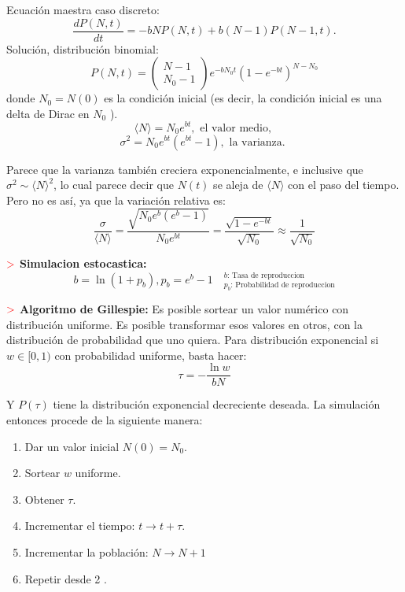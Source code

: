 \documentclass[%
 reprint,
 amsmath,amssymb,
 aps,
]{revtex4-1}
\newcommand{\propiedad}{\textcolor{red}{\mathbf{>}}}
\begin{document}
Ecuación maestra caso discreto:
$$
  \frac{d P(N, t)}{d t}=-b N P(N, t)+b(N-1) P(N-1, t) .
$$
Solución, distribución binomial: 
$$
P(N, t)=\left(\begin{array}{c}
N-1 \\
N_{0}-1
\end{array}\right) e^{-b N_{0} t}\left(1-e^{-b t}\right)^{N-N_{0}}
$$
donde $N_{0}=N(0)$ es la condición inicial (es decir, la condición inicial es una delta de Dirac en $N_{0}$ ).
$$
\langle N\rangle=N_{0} e^{b t}, \text { el valor medio, }
$$
$$
\sigma^{2}=N_{0} e^{b t}\left(e^{b t}-1\right), \text { la varianza. }
$$

Parece que la varianza también creciera exponencialmente, e inclusive que $\sigma^{2} \sim\langle N\rangle^{2}$, lo cual parece decir que $N(t)$ se aleja de $\langle N\rangle$ con el paso del tiempo. Pero no es así, ya que la variación relativa es:
$$
\frac{\sigma}{\langle N\rangle}=\frac{\sqrt{N_{0} e^{b}\left(e^{b}-1\right)}}{N_{0} e^{b t}}=\frac{\sqrt{1-e^{- b{t} }}}{\sqrt{N_{0}}} \approx \frac{1}{\sqrt{N_{0}}}
$$

$\propiedad$ \textbf{Simulacion estocastica:}
$$
  b=\ln \left(1+p_{b}\right), p_{b}=e^{b}-1 \quad
  ^{b \text{: Tasa de reproduccion}}
  _{p_b \text{: Probabilidad de reproduccion}}
$$


$\propiedad$ \textbf{Algoritmo de Gillespie:}
Es posible sortear un valor numérico con distribución uniforme. Es posible transformar esos valores en otros, con la distribución de probabilidad que uno quiera. Para distribución exponencial si $w \in[0,1)$ con probabilidad uniforme, basta hacer:
$$
\tau=-\frac{\ln w}{b N}
$$

Y $P(\tau)$ tiene la distribución exponencial decreciente deseada. La simulación entonces procede de la siguiente manera:
\begin{enumerate}
  \item Dar un valor inicial $N(0)=N_{0}$.
  \item Sortear $w$ uniforme.
  \item Obtener $\tau$.
  \item Incrementar el tiempo: $t \rightarrow t+\tau$.
  \item Incrementar la población: $N \rightarrow N+1$
  \item Repetir desde 2 .
\end{enumerate}

\end{document}

